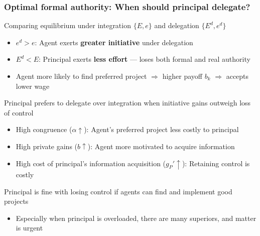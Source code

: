 \documentclass[aspectratio=169]{beamer}
\begin{document}
\begin{frame}
\frametitle{Optimal formal authority: When should principal delegate?}
Comparing equilibrium under integration $\{E, e\}$ and delegation $\{E^d, e^d\}$
\begin{itemize}\setlength\itemsep{3pt}
\item $e^d > e$: Agent exerts \textbf{greater initiative} under delegation
\item $E^d < E$: Principal exerts \textbf{less effort} — loses both formal and real authority
\item Agent more likely to find preferred project $\Rightarrow$ higher payoff $b_k$ $\Rightarrow$ accepts lower wage
\end{itemize}\medskip
Principal prefers to delegate over integration when initiative gains outweigh loss of control
\begin{itemize}\setlength\itemsep{3pt}
\item High congruence ($\alpha \uparrow$): Agent's preferred project less costly to principal
\item High private gains ($b \uparrow$): Agent more motivated to acquire information
\item High cost of principal's information acquisition ($g_P' \uparrow$): Retaining control is costly
\end{itemize}\medskip
Principal is fine with losing control if agents can find and implement good projects 
\begin{itemize}\setlength\itemsep{3pt}
  \item Especially when principal is overloaded, there are many superiors, and matter is urgent
\end{itemize}
\end{frame}
\end{document}
